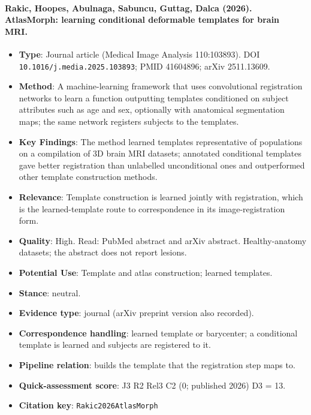 \documentclass[journal,onecolumn]{IEEEtran}
\begin{document}
\paragraph{Rakic, Hoopes, Abulnaga, Sabuncu, Guttag, Dalca (2026). AtlasMorph: learning conditional deformable templates for brain MRI.~\cite{Rakic2026AtlasMorph}}\mbox{}

\begin{itemize}

\item{} \textbf{Type}: Journal article (Medical Image Analysis 110:103893). DOI \nolinkurl{10.1016/j.media.2025.103893}; PMID 41604896; arXiv 2511.13609.

\item{} \textbf{Method}: A machine-learning framework that uses convolutional registration networks to learn a function outputting templates conditioned on subject attributes such as age and sex, optionally with anatomical segmentation maps; the same network registers subjects to the templates.

\item{} \textbf{Key Findings}: The method learned templates representative of populations on a compilation of 3D brain MRI datasets; annotated conditional templates gave better registration than unlabelled unconditional ones and outperformed other template construction methods.

\item{} \textbf{Relevance}: Template construction is learned jointly with registration, which is the learned-template route to correspondence in its image-registration form.

\item{} \textbf{Quality}: High. Read: PubMed abstract and arXiv abstract. Healthy-anatomy datasets; the abstract does not report lesions.

\item{} \textbf{Potential Use}: Template and atlas construction; learned templates.

\item{} \textbf{Stance}: neutral.

\item{} \textbf{Evidence type}: journal (arXiv preprint version also recorded).

\item{} \textbf{Correspondence handling}: learned template or barycenter; a conditional template is learned and subjects are registered to it.

\item{} \textbf{Pipeline relation}: builds the template that the registration step maps to.

\item{} \textbf{Quick-assessment score}: J3 R2 Rel3 C2 (0; published 2026) D3 = 13.

\item{} \textbf{Citation key}: \texttt{Rakic2026AtlasMorph}

\end{itemize}
\end{document}
